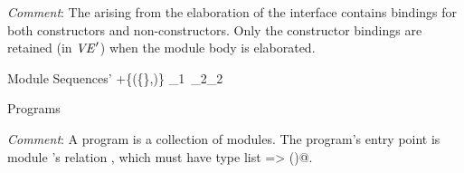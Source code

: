 \par\noindent\emph{Comment}: The \VE{} arising from the elaboration
of the interface contains bindings for both constructors and non-constructors.
Only the constructor bindings are retained (in $\mbox{\textit{VE}}'$) when the
module body is elaborated.

\begin{relation}{Module Sequences}{\ME\vdash{}\Rightarrow\ME'}
	{\ME\vdash{}\Rightarrow\ME+\{\mapsto(\{\},\VE)\}}
\rruleskip
{}
	{\ME\vdash{}_1~_2\Rightarrow\ME_2}
\end{relation}

\begin{relation}{Programs}{\vdash{}}
	{\vdash{}}
\end{relation}

\par\noindent\emph{Comment}:
A program is a collection of modules. The program's entry point is
module \verb@Main@'s relation \verb@main@, which
must have type \verb@string list => ()@.
